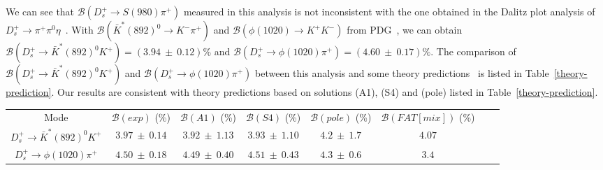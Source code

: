 \documentclass[aps,prd,twocolumn,showpacs,amsmath,amssymb]{revtex4-1}
\begin{document}
    We can see that $\mathcal{B}(D_{s}^{+} \rightarrow S(980)\pi^{+})$ measured in this analysis is not inconsistent with the one obtained in the Dalitz plot analysis of $D_{s}^{+} \rightarrow \pi^{+}\pi^{0}\eta$~\cite{Doc-DB-682-v7}.
    With $\mathcal{B}(\bar{K}^{*}(892)^{0} \rightarrow K^{-}\pi^{+})$ and $\mathcal{B}(\phi(1020) \rightarrow K^{+}K^{-})$ from PDG~\cite{PDG}, we can obtain $\mathcal{B}(D_{s}^{+} \rightarrow \bar{K}^{*}(892)^{0}K^{+}) = (3.94\ \pm\ 0.12)\%$ and $\mathcal{B}(D_{s}^{+} \rightarrow \phi(1020)\pi^{+}) = (4.60\ \pm\ 0.17)\%$.
    The comparison of  $\mathcal{B}(D_{s}^{+} \rightarrow \bar{K}^{*}(892)^{0}K^{+})$ and $\mathcal{B}(D_{s}^{+} \rightarrow \phi(1020)\pi^{+})$ between this analysis and some theory predictions~\cite{PRD93-114010} is listed in Table~\ref{theory-prediction}.
    Our results are consistent with theory predictions based on solutions (A1), (S4) and (pole) listed in Table~\ref{theory-prediction}.
    \begin{table*}[htbp]
        \caption{The comparison of $\mathcal{B}(D_{s}^{+} \rightarrow \bar{K}^{*}(892)^{0}K^{+})$ and $\mathcal{B}(D_{s}^{+} \rightarrow \phi(1020)\pi^{+})$ between this analysis and some theory predictions.
            $\mathcal{B}(exp)$ is the corresponding result of this analysis.  $\mathcal{B}(A1)$, $\mathcal{B}(S4)$, $\mathcal{B}(pole)$ and $\mathcal{B}(FAT[mix])$ are theory predictions~\cite{PRD93-114010}. 
        }
        \label{theory-prediction}
        \begin{center}
            \begin{tabular}{cccccccc}
                \hline\hline
                Mode & $\mathcal{B}(exp)$ (\%)   & $\mathcal{B}(A1)$ (\%)& $\mathcal{B}(S4)$ (\%)&  $\mathcal{B}(pole)$ (\%)&$\mathcal{B}(FAT[mix])$ (\%)&\\
                $D_{s}^{+} \rightarrow \bar{K}^{*}(892)^{0}K^{+}$           & $3.97\ \pm\ 0.14$    & $3.92\ \pm\ 1.13$  & $3.93\ \pm\ 1.10$  & $4.2\ \pm\ 1.7$  & $4.07$  \\
                $D_{s}^{+} \rightarrow \phi(1020)\pi^{+}$                   & $4.50\ \pm\ 0.18$    & $4.49\ \pm\ 0.40$  & $4.51\ \pm\ 0.43$  & $4.3\ \pm\ 0.6$  & $3.4$  \\
                \hline\hline
            \end{tabular}
        \end{center}
    \end{table*}
\end{document}

